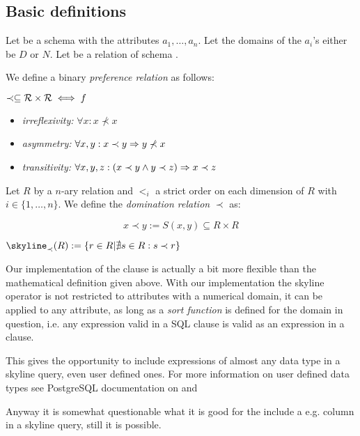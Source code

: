 \subsection{Basic definitions}
Let  be a schema with the attributes $a_1, \ldots, a_n$. 
Let the domains of the $a_i$'s either be $D$ or $N$.
Let  be a relation of schema .

We define a binary \emph{preference relation} as follows:
\begin{definition}
$\prec \subseteq \mathcal{R}\times\mathcal{R} \iff f$
\end{definition}

\begin{itemize}
\item \emph{irreflexivity:} $\forall x: x \not\prec x$
\item \emph{asymmetry:} $\forall x, y: x \prec y \Rightarrow y \not\prec x$
\item \emph{transitivity:} $\forall x, y, z: (x \prec y \land y \prec z) \Rightarrow x \prec z$
\end{itemize}

Let $R$ by a $n$-ary relation and $<_i$ a strict order on each dimension of $R$ with $i \in \{1, \ldots, n\}$.
We define the \emph{domination relation} $\prec$ as:

\[x \prec y := S(x, y) \subseteq R \times R\]

$\skyline_\prec(R) := \{ r \in R | \nexists s \in R : s \prec r \}$


Our implementation of the  clause is actually a bit more flexible than the mathematical definition given above. With our implementation the skyline operator is not restricted to attributes with a numerical domain, it can be applied to any attribute, as long as a \emph{sort function} is defined for the domain in question, i.e.\/ any expression valid in a SQL  clause is valid as an expression in a  clause.

This gives the opportunity to include expressions of almost any data type in a skyline query, even user defined ones. For more information on user defined data types see PostgreSQL documentation on  and 

Anyway it is somewhat questionable what it is good for the include a e.g.  column in a skyline query, still it is possible.

